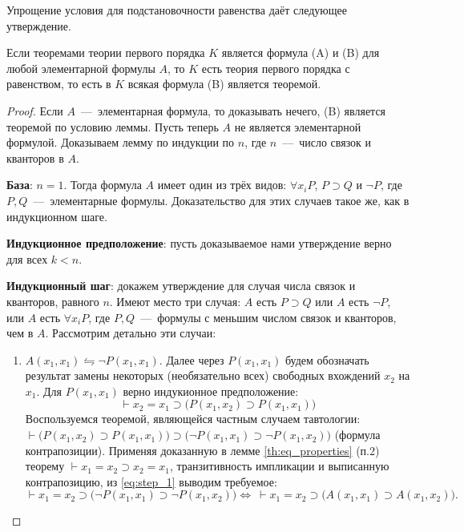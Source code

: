 Упрощение условия для подстановочности равенства даёт следующее утверждение.
\begin{lemma}
    Если теоремами теории первого порядка $K$ является формула (A) и (B) для любой элементарной формулы $A$, то $K$ есть теория первого порядка с равенством, то есть в $K$ всякая формула (B) является теоремой.
\end{lemma}
\begin{proof}
    Если $A$~---~элементарная формула, то доказывать нечего, (B) является теоремой по условию леммы. Пусть теперь $A$ не является элементарной формулой. Доказываем лемму по индукции по $n$, где $n$~---~число связок и кванторов в $A$.

    \textbf{База}: $n = 1$. Тогда формула $A$ имеет один из трёх видов: $\forall x_iP$, $P \supset Q$ и $\neg P$, где $P, Q$~---~элементарные формулы. Доказательство для этих случаев такое же, как в индукционном шаге.

    \textbf{Индукционное предположение}: пусть доказываемое нами утверждение верно для всех $k < n$.

    \textbf{Индукционный шаг}: докажем утверждение для случая числа связок и кванторов, равного $n$. Имеют место три случая: $A$ есть $P \supset Q$ или $A$ есть $\neg P$, или $A$ есть $\forall x_iP$, где $P, Q$~---~формулы с меньшим числом связок и кванторов, чем в $A$. Рассмотрим детально эти случаи:
    \begin{enumerate}
        \item \underline{$A(x_1, x_1) \leftrightharpoons \neg P(x_1, x_1)$}. Далее через $P(x_1, x_1)$ будем обозначать результат замены некоторых (необязательно всех) свободных вхождений $x_2$ на $x_1$. Для $P(x_1, x_1)$ верно индукионное предположение:
        \begin{equation}\label{eq:step_1}
            \vdash x_2 = x_1 \supset \big(P(x_1, x_2) \supset P(x_1, x_1)\big)
        \end{equation}
        Воспользуемся теоремой, являющейся частным случаем тавтологии: $\vdash \big(P(x_1, x_2) \supset P(x_1, x_1)\big) \supset \big(\neg P(x_1, x_1) \supset \neg P(x_1, x_2)\big)$ (формула контрапозиции). Применяя доказанную в лемме \ref{th:eq_properties} (п.2) теорему $\vdash x_1 = x_2 \supset x_2 = x_1$, транзитивность импликации и выписанную контрапозицию, из \eqref{eq:step_1} выводим требуемое:
        \[
            \vdash x_1 = x_2 \supset \big(\neg P(x_1, x_1) \supset \neg P(x_1, x_2)\big) \Longleftrightarrow\ \vdash x_1 = x_2 \supset \big(A(x_1, x_1) \supset A(x_1, x_2)\big).
        \]


\end{enumerate}
\end{proof}
